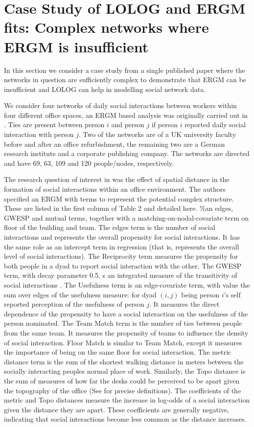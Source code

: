 \documentclass[
]{statsoc}
\begin{document}
\section{Case Study of LOLOG and ERGM fits: Complex networks where ERGM is insufficient}\label{sec:offices}

In this section we consider a case study from a single published paper
where the networks in question are sufficiently complex to demonstrate
that ERGM can be insufficient and LOLOG can help in modelling social
network data.

We consider four networks of daily social interactions between workers
within four different office spaces, an ERGM based analysis was
originally carried out in \cite{Sailer2012}. Ties are present between
person \(i\) and person \(j\) if person \(i\) reported daily social
interaction with person \(j\). Two of the networks are of a UK
university faculty before and after an office refurbishment, the
remaining two are a German research institute and a corporate publishing
company. The networks are directed and have 69, 63, 109 and 120
people/nodes, respectively.

The research question of interest in \cite{Sailer2012} was the effect of
spatial distance in the formation of social interactions within an
office environment. The authors specified an ERGM with terms to
represent the potential complex structure. These are listed in the first
column of Table 2 and detailed here. \%an edges, GWESP and mutual terms,
together with a matching-on-nodal-covariate term on floor of the
building and team. The edges term is the number of social interactions
and represents the overall propensity for social interactions. It has
the same role as an intercept term in regression (that is, represents
the overall level of social interactions). The Reciprocity term measures
the propensity for both people in a dyad to report social interaction
with the other. The GWESP term, with decay parameter 0.5, s an
integrated measure of the transitivity of social interactions
\citep[See][for a detailed
explanation]{snijders2006}. The Usefulness term is an edge-covariate
term, with value the sum over edges of the usefulness measure: for dyad
\((i,j)\) being person \(i\)'s self reported perception of the
usefulness of person \(j\). It measures the direct dependence of the
propensity to have a social interaction on the usefulness of the person
nominated. The Team Match term is the number of ties between people from
the same team. It measures the propensity of teams to influence the
density of social interaction. Floor Match is similar to Team Match,
except it measures the importance of being on the same floor for social
interaction. The metric distance term is the sum of the shortest walking
distance in meters between the socially interacting peoples normal place
of work. Similarly, the Topo distance is the sum of measures of how far
the desks could be perceived to be apart given the topography of the
office (See \cite{Sailer2012} for precise definitions). The coefficients
of the metric and Topo distances measure the increase in log-odds of a
social interaction given the distance they are apart. These coefficients
are generally negative, indicating that social interactions become less
common as the distance increases.
\end{document}
